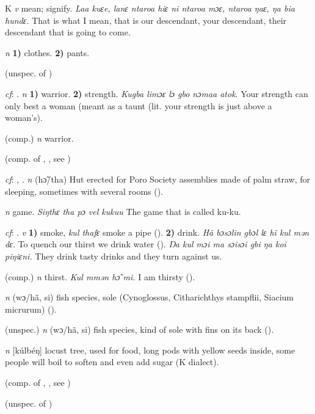\begin{letter}{K}
 \textit{v} mean; signify. \textit{Laa kuɛe, lanɛ ntaroa hiɛ ni ntaroa mɔɛ, ntaroa ŋaɛ, ŋa bia hundɛ.} That is what I mean, that is our descendant, your descendant, their descendant that is going to come.

 \textit{n} \textbf{1)} clothes. \textbf{2)} pants.

 (unspec. of ) 

 \textit{cf}: . \textit{n} \textbf{1)} warrior. \textbf{2)} strength. \textit{Kugba limɔɛ lɔ gbo nɔmaa atok}. Your strength can only best a woman (meant as a taunt (lit. your strength is just above a woman's).

 (comp.) \textit{n} warrior.

 (comp. of , , see ) 

 \textit{cf}: , . \textit{n} (hɔ̃/tha) Hut erected for Poro Society assemblies made of palm straw, for sleeping, sometimes with several rooms (\citealt{Pichl1967}).

 \textit{n} game. \textit{Siŋthɛ tha pɔ vel kukuu} The game that is called ku-ku.

 \textit{cf}: . \textit{v} \textbf{1)} smoke, \textit{kul thafɛ} smoke a pipe (\citealt{Pichl1967}). \textbf{2)} drink. \textit{Hã bɔsɔlin gbɔl lɛ hĩ kul mən dɛ.} To quench our thirst we drink water (\citealt{Pichl1967}). \textit{Ŋa kul mɔi ma sɔisɔi gbi ŋa koi piŋiɛni.} They drink tasty drinks and they turn against us.

 (comp.) \textit{n} thirst. \textit{Kul mmən hɔ̃ mi.} I am thirsty (\citealt{Pichl1967}).

 \textit{n} (wɔ/hã, si) fish species, sole (Cynoglossus, Citharichthys stampflii, Siacium micrurum) (\citealt{Pichl1967}). 

 (unspec.) \textit{n} (wɔ/hã, si) fish species, kind of sole with fins on its back (\citealt{Pichl1967}). 

 \textit{n} [kúlbéŋ] locust tree, used for food, long pods with yellow seeds inside, some people will boil to soften and even add sugar (K dialect).

 (comp. of , , see ) 

 (unspec. of ) 


\end{letter}
